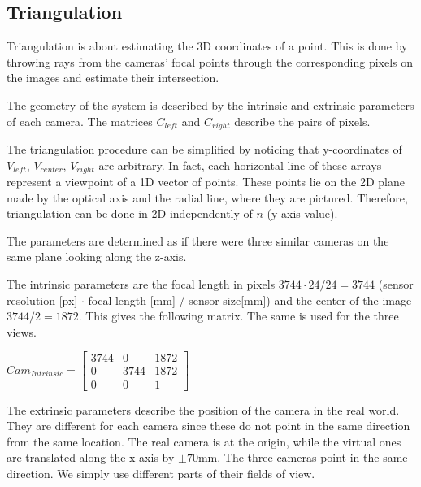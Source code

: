 \documentclass[a4paper,twocolumn,fleqn]{article}
\begin{document}
\subsection{Triangulation}
Triangulation is about estimating the 3D coordinates of a point. This is done by throwing rays from the cameras' focal points through the corresponding pixels on the images and estimate their intersection.

The geometry of the system is described by the intrinsic and extrinsic parameters of each camera. The matrices $C_{left}$ and $C_{right}$ describe the pairs of pixels.

The triangulation procedure can be simplified by noticing that y-coordinates of $V_{left}$, $V_{center}$, $V_{right}$ are arbitrary. In fact, each horizontal line of these arrays represent a viewpoint of a 1D vector of points. These points lie on the 2D plane made by the optical axis and the radial line, where they are pictured. Therefore, triangulation can be done in 2D independently of $n$ (y-axis value).

The parameters are determined as if there were three similar cameras on the same plane looking along the z-axis.

The intrinsic parameters are the focal length in pixels $3744 \cdot 24 / 24 = 3744$ (sensor resolution [px] $\cdot$ focal length [mm] / sensor size[mm]) and the center of the image $3744 / 2 = 1872$.  This gives the following matrix. The same is used for the three views.

\begin{center}
$Cam_{Intrinsic} =
\begin{bmatrix}
3744 & 0 & 1872\\
0 & 3744 & 1872\\
0 & 0 & 1
\end{bmatrix}$
\end{center}

The extrinsic parameters describe the position of the camera in the real world. They are different for each camera since these do not point in the same direction from the same location. The real camera is at the origin, while the virtual ones are translated along the x-axis by $\pm 70$mm. The three cameras point in the same direction. We simply use different parts of their fields of view.
\end{document}

